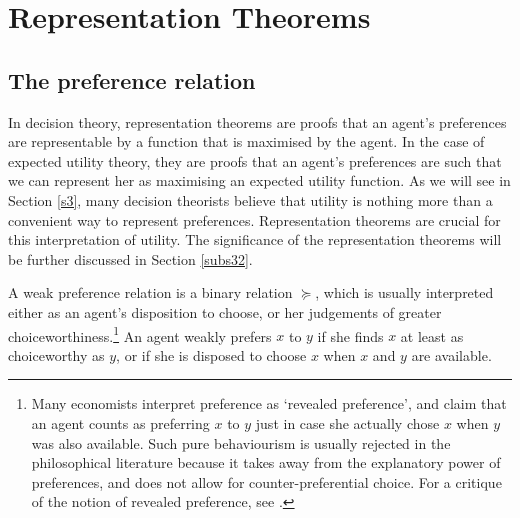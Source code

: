 \section{Representation Theorems} \label{s2}

\subsection{The preference relation}\label{subs21}

In decision theory, representation theorems are proofs that an agent's preferences are representable by a function that is maximised by the agent. In the case of expected utility theory, they are proofs that an agent's preferences are such that we can represent her as maximising an expected utility function. As we will see in Section \ref{s3}, many decision theorists believe that utility is nothing more than a convenient way to represent preferences. Representation theorems are crucial for this interpretation of utility. The significance of the representation theorems will be further discussed in Section \ref{subs32}.

A weak preference relation is a binary relation $\succcurlyeq$, which is usually interpreted either as an agent's disposition to choose, or her judgements of greater choiceworthiness.\footnote{Many economists interpret preference as `revealed preference', and claim that an agent counts as preferring $x$ to $y$ just in case she actually chose $x$ when $y$ was also available. Such pure behaviourism is usually rejected in the philosophical literature because it takes away from the explanatory power of preferences, and does not allow for counter-preferential choice. For a critique of the notion of revealed preference, see \citet{Hausman2000}.} An agent weakly prefers $x$ to $y$ if she finds $x$ at least as choiceworthy as $y$, or if she is disposed to choose $x$ when $x$ and $y$ are available.

